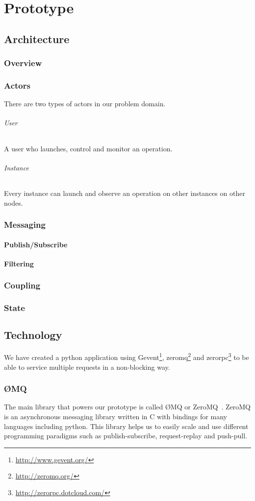 \chapter{Prototype}
\label{cha:prototype}

\section{Architecture}
\subsection{Overview}
\subsection{Actors}
There are two types of actors in our problem domain.
\subparagraph{User}
A user who launches, control and monitor an operation.
\subparagraph{Instance}
Every instance can launch and observe an operation on other instances on other nodes.
\subsection{Messaging}
\subsubsection{Publish/Subscribe}
\subsubsection{Filtering}
\subsection{Coupling}
\subsection{State}

\section{Technology}
We have created a python application using Gevent\footnote{\url{http://www.gevent.org/}},
zeromq\footnote{\url{http://zeromq.org/}} and zerorpc\footnote{\url{http://zerorpc.dotcloud.com/}} 
to be able to service multiple requests in a non-blocking way. 

\subsection{ØMQ}
The main library that powers our prototype is called ØMQ or ZeroMQ~\cite{ZeroMQ}.
ZeroMQ is an asynchronous messaging library written in C with 
bindings for many languages including python. This library helps us to easily scale and use 
different programming paradigms such as publish-subscribe, request-replay and push-pull.

